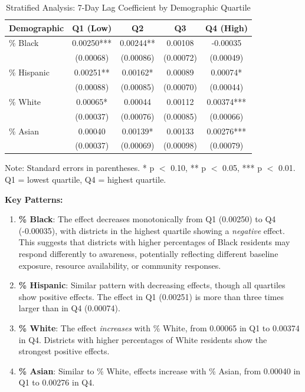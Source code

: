 \documentclass[11pt,a4paper]{article}
\begin{document}
\begin{table}[H]
\centering
\caption{Stratified Analysis: 7-Day Lag Coefficient by Demographic Quartile}
\label{tab:stratified}
\begin{tabular}{lcccc}
\toprule
Demographic & Q1 (Low) & Q2 & Q3 & Q4 (High) \\
\midrule
\% Black & 0.00250*** & 0.00244** & 0.00108 & -0.00035 \\
 & (0.00068) & (0.00086) & (0.00072) & (0.00049) \\
\midrule
\% Hispanic & 0.00251** & 0.00162* & 0.00089 & 0.00074* \\
 & (0.00088) & (0.00085) & (0.00070) & (0.00044) \\
\midrule
\% White & 0.00065* & 0.00044 & 0.00112 & 0.00374*** \\
 & (0.00037) & (0.00076) & (0.00085) & (0.00066) \\
\midrule
\% Asian & 0.00040 & 0.00139* & 0.00133 & 0.00276*** \\
 & (0.00037) & (0.00069) & (0.00098) & (0.00079) \\
\bottomrule
\end{tabular}
\footnotesize
Note: Standard errors in parentheses. * p $<$ 0.10, ** p $<$ 0.05, *** p $<$ 0.01. Q1 = lowest quartile, Q4 = highest quartile.
\end{table}

\textbf{Key Patterns:}

\begin{enumerate}
    \item \textbf{\% Black}: The effect decreases monotonically from Q1 (0.00250) to Q4 (-0.00035), with districts in the highest quartile showing a \textit{negative} effect. This suggests that districts with higher percentages of Black residents may respond differently to awareness, potentially reflecting different baseline exposure, resource availability, or community responses.
    
    \item \textbf{\% Hispanic}: Similar pattern with decreasing effects, though all quartiles show positive effects. The effect in Q1 (0.00251) is more than three times larger than in Q4 (0.00074).
    
    \item \textbf{\% White}: The effect \textit{increases} with \% White, from 0.00065 in Q1 to 0.00374 in Q4. Districts with higher percentages of White residents show the strongest positive effects.
    
    \item \textbf{\% Asian}: Similar to \% White, effects increase with \% Asian, from 0.00040 in Q1 to 0.00276 in Q4.
\end{enumerate}
\end{document}
